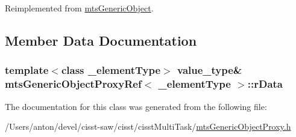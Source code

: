 Reimplemented from \hyperlink{classmts_generic_object_a4916a6c62ee5b167d7c93c88ab72523a}{mts\+Generic\+Object}.



\subsection{Member Data Documentation}
\hypertarget{classmts_generic_object_proxy_ref_a588d268b7943faf5949bc201e5ef502a}{}
\subsubsection[{r\+Data}]{\setlength{\rightskip}{0pt plus 5cm}template$<$class \+\_\+element\+Type$>$ {\bf value\+\_\+type}\& {\bf mts\+Generic\+Object\+Proxy\+Ref}$<$ \+\_\+element\+Type $>$\+::r\+Data}\label{classmts_generic_object_proxy_ref_a588d268b7943faf5949bc201e5ef502a}


The documentation for this class was generated from the following file\+:\begin{DoxyCompactItemize}
\item 
/\+Users/anton/devel/cisst-\/saw/cisst/cisst\+Multi\+Task/\hyperlink{mts_generic_object_proxy_8h}{mts\+Generic\+Object\+Proxy.\+h}\end{DoxyCompactItemize}

